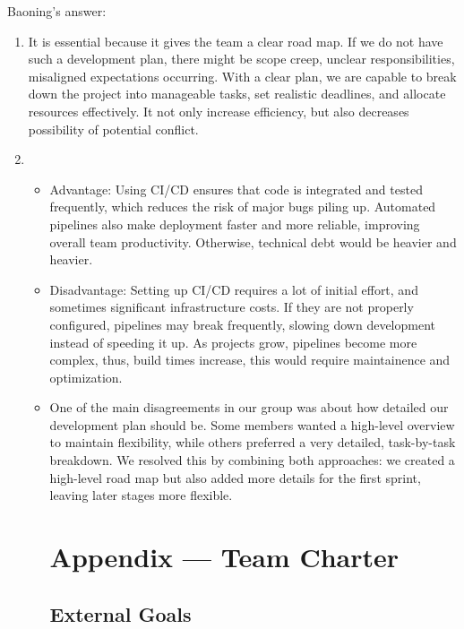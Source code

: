 \documentclass{article}
\begin{document}
Baoning's answer: \\
\begin{enumerate}
  \item It is essential because it gives the team a clear road map. If we do not have such a development plan, there might be scope creep, unclear responsibilities, misaligned expectations occurring. With a clear plan, we are capable to break down the project into manageable tasks, set realistic deadlines, and allocate resources effectively. It not only increase efficiency, but also decreases possibility of potential conflict.
  \item 
  \begin{itemize}
    \item Advantage: Using CI/CD ensures that code is integrated and tested frequently, which reduces the risk of major bugs piling up. Automated pipelines also make deployment faster and more reliable, improving overall team productivity. Otherwise, technical debt would be heavier and heavier.

    \item Disadvantage: Setting up CI/CD requires a lot of initial effort, and sometimes significant infrastructure costs. If they are not properly configured, pipelines may break frequently, slowing down development instead of speeding it up. As projects grow, pipelines become more complex, thus, build times increase, this would require maintainence and optimization.
	\item One of the main disagreements in our group was about how detailed our development plan should be. Some members wanted a high-level overview to maintain flexibility, while others preferred a very detailed, task-by-task breakdown. We resolved this by combining both approaches: we created a high-level road map but also added more details for the first sprint, leaving later stages more flexible.




\section*{Appendix --- Team Charter}


\subsection*{External Goals}


\end{itemize}
\end{enumerate}
\end{document}
